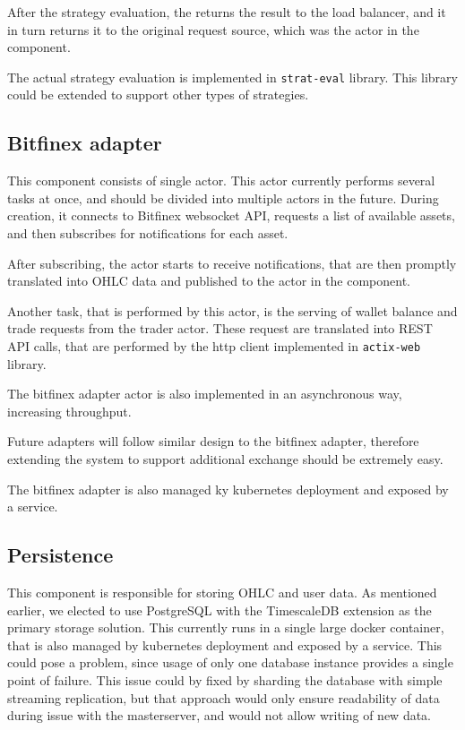 After the strategy evaluation, the  returns the result to the load balancer, and it in turn returns it
to the original request source, which was the  actor in the  component.

The actual strategy evaluation is implemented in \verb|strat-eval| library. This library could be extended to support other types of
strategies.


\subsection{Bitfinex adapter}
This component consists of single actor. This actor currently performs several tasks at once, and should be
divided into multiple actors in the future. During creation, it connects to Bitfinex websocket API,
requests a list of available assets, and then subscribes for notifications for each asset.

After subscribing, the actor starts to receive notifications, that are then promptly translated into OHLC data
and published to the  actor in the  component.

Another task, that is performed by this actor, is the serving of wallet balance and trade requests from the
trader actor. These request are translated into REST API calls, that are performed by the http client implemented
in \verb|actix-web| library.

The bitfinex adapter actor is also implemented in an asynchronous way, increasing throughput.

Future adapters will follow similar design to the bitfinex adapter, therefore
extending the system to support additional exchange should be extremely easy.

The bitfinex adapter is also managed ky kubernetes deployment and exposed by a service.



\subsection{Persistence}
This component is responsible for storing OHLC and user data. As mentioned earlier, we elected to use PostgreSQL
with the TimescaleDB extension as the primary storage solution. This currently runs in a single large docker
container, that is also managed by kubernetes deployment and exposed by a service. This could pose a problem,
since usage of only one database instance provides a single point of failure. This issue could by fixed by sharding the
database with simple streaming replication, but that approach would only ensure readability of data during issue
with the masterserver, and would not allow writing of new data.

